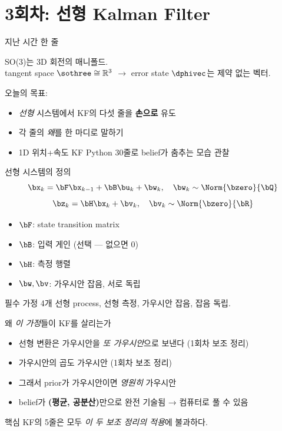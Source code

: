 
\section{3회차: 선형 Kalman Filter}


\begin{frame}{지난 시간 한 줄}
  \begin{center}
    \large
    SO(3)는 3D 회전의 매니폴드. \\
    tangent space $\sothree \cong \mathbb{R}^3$ $\rightarrow$ error state $\dphivec$는 제약 없는 벡터.
  \end{center}
  \vspace{0.5em}
  오늘의 목표:
  \begin{itemize}
    \item \emph{선형} 시스템에서 KF의 다섯 줄을 \textbf{손으로} 유도
    \item 각 줄의 \emph{왜}를 한 마디로 말하기
    \item 1D 위치+속도 KF Python 30줄로 belief가 춤추는 모습 관찰
  \end{itemize}
\end{frame}

\begin{frame}{선형 시스템의 정의}
  \[
    \bx_{k} = \bF \bx_{k-1} + \bB \bu_k + \bw_k, \quad \bw_k \sim \Norm{\bzero}{\bQ}
  \]
  \[
    \bz_{k} = \bH \bx_{k} + \bv_k, \quad \bv_k \sim \Norm{\bzero}{\bR}
  \]
  \begin{itemize}
    \item $\bF$: state transition matrix
    \item $\bB$: 입력 게인 (선택 — 없으면 0)
    \item $\bH$: 측정 행렬
    \item $\bw, \bv$: 가우시안 잡음, 서로 독립
  \end{itemize}
  \pause
  \vspace{0.3em}
  \begin{block}{필수 가정 4개}
    선형 process, 선형 측정, 가우시안 잡음, 잡음 독립.
  \end{block}
\end{frame}

\begin{frame}{왜 \emph{이 가정}들이 KF를 살리는가}
  \begin{itemize}
    \item 선형 변환은 가우시안을 \emph{또 가우시안}으로 보낸다 (1회차 보조 정리)
    \item 가우시안의 곱도 가우시안 (1회차 보조 정리)
    \item 그래서 prior가 가우시안이면 \emph{영원히} 가우시안
    \item belief가 \textbf{(평균, 공분산)}만으로 완전 기술됨 → 컴퓨터로 풀 수 있음
  \end{itemize}
  \pause
  \vspace{0.5em}
  \begin{block}{핵심}
    KF의 5줄은 모두 \emph{이 두 보조 정리의 적용}에 불과하다.
  \end{block}
\end{frame}

